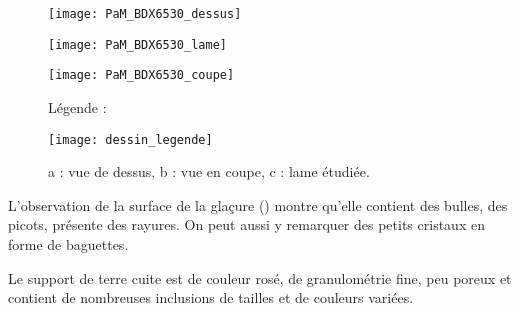 \begin{figure}[htb]
  \begin{minipage}[t]{0.5\textwidth}
    \centerfloat
    \vspace*{0pt}
    \texttt{[image: PaM\_BDX6530\_dessus]}
  \end{minipage}%
  \quad%
  \begin{minipage}[t]{0.5\textwidth}
    \centerfloat
    \vspace*{0pt}
    \texttt{[image: PaM\_BDX6530\_lame]}
  \end{minipage}

  \bigskip

  \begin{minipage}[t]{0.5\textwidth}
    \centerfloat
    \vspace*{0pt}
    \texttt{[image: PaM\_BDX6530\_coupe]}
  \end{minipage}%
  \quad%
  \begin{minipage}[t]{0.5\textwidth}
    \vspace*{0pt}
    Légende :

    \texttt{[image: dessin\_legende]}
  \end{minipage}
  \caption{\legendeB 
           a : vue de dessus, b : vue en coupe, c : lame étudiée.}
  \label{dessin:6530}
\end{figure}

L'observation de la surface de la glaçure () montre 
qu'elle contient des bulles, des picots, présente des rayures. On peut 
aussi y remarquer des petits cristaux en forme de baguettes.

Le support de terre cuite est de couleur rosé, de granulométrie fine, 
peu poreux et contient de nombreuses inclusions de tailles et de 
couleurs variées.

